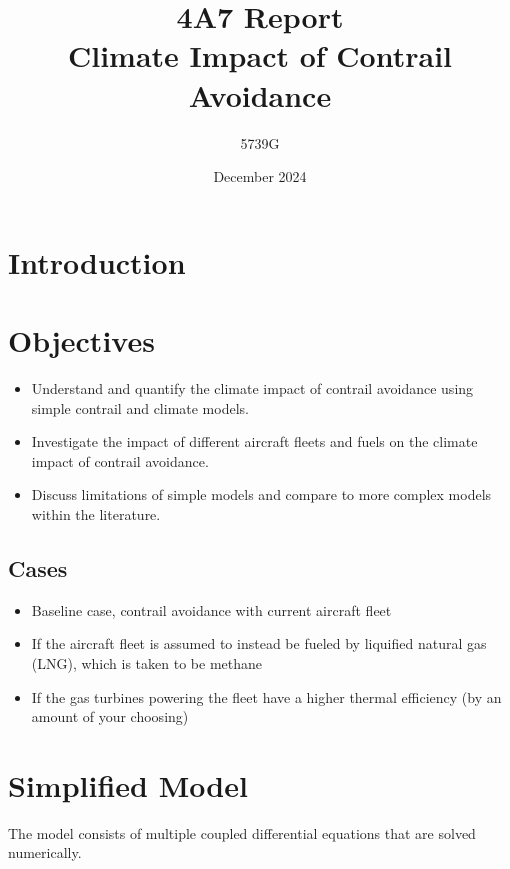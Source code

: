 \documentclass{article}
\begin{document}
\title{4A7 Report \\ Climate Impact of Contrail Avoidance}
\author{5739G}
\date{December 2024}
\maketitle

\section{Introduction}

\section{Objectives}

\begin{itemize}
    \item Understand and quantify the climate impact of contrail avoidance using simple contrail and climate models.
    \item Investigate the impact of different aircraft fleets and fuels on the climate impact of contrail avoidance.
    \item Discuss limitations of simple models and compare to more complex models within the literature.
\end{itemize}

\subsection{Cases}

\begin{itemize}
    \item Baseline case, contrail avoidance with current aircraft fleet
    \item If the aircraft fleet is assumed to instead be fueled by liquified natural gas (LNG), which is taken to be methane
    \item If the gas turbines powering the fleet have a higher thermal efficiency (by an amount of your choosing) 
\end{itemize}

\section{Simplified Model}

The model consists of multiple coupled differential equations that are solved numerically.
\end{document}
